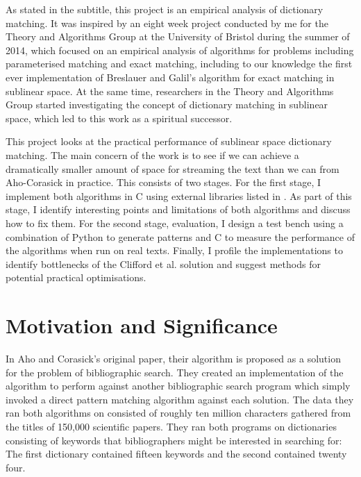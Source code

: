 \documentclass[ %
                    author={Dominic Joseph Moylett},
                    degree={MEng},
                     title={Dictionary Matching with Fingerprints},
                  subtitle={An Empirical Analysis},
                      type={research},
                      year={2015} ]{dissertation}
\begin{document}
As stated in the subtitle, this project is an empirical analysis of dictionary matching. It was inspired by an eight week project conducted by me for the Theory and Algorithms Group at the University of Bristol during the summer of 2014, which focused on an empirical analysis of algorithms for problems including parameterised matching and exact matching, including to our knowledge the first ever implementation of Breslauer and Galil's algorithm for exact matching in sublinear space. At the same time, researchers in the Theory and Algorithms Group started investigating the concept of dictionary matching in sublinear space, which led to this work as a spiritual successor.

This project looks at the practical performance of sublinear space dictionary matching. The main concern of the work is to see if we can achieve a dramatically smaller amount of space for streaming the text than we can from Aho-Corasick in practice. This consists of two stages. For the first stage, I implement both algorithms in C using external libraries listed in . As part of this stage, I identify interesting points and limitations of both algorithms and discuss how to fix them. For the second stage, evaluation, I design a test bench using a combination of Python to generate patterns and C to measure the performance of the algorithms when run on real texts. Finally, I profile the implementations to identify bottlenecks of the Clifford et al. solution and suggest methods for potential practical optimisations.

\section{Motivation and Significance}

In Aho and Corasick's original paper, their algorithm is proposed as a solution for the problem of bibliographic search. They created an implementation of the algorithm to perform against another bibliographic search program which simply invoked a direct pattern matching algorithm against each solution. The data they ran both algorithms on consisted of roughly ten million characters gathered from the titles of 150,000 scientific papers. They ran both programs on dictionaries consisting of keywords that bibliographers might be interested in searching for: The first dictionary contained fifteen keywords and the second contained twenty four.
\end{document}
